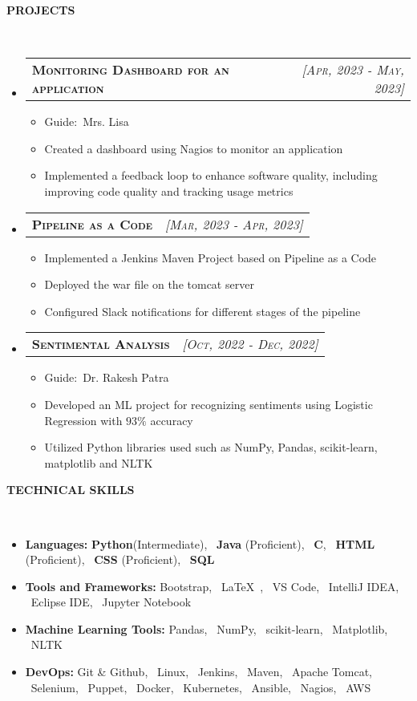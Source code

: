 \documentclass[a4paper,10pt]{article}
\makeatletter
\newcommand{\lsep}{-0.5cm}
\newcommand{\resitem}[1]{\item #1 \vspace{-2pt}}
\newcommand{\resheading}[1]{{\small \colorbox{mygrey}{\begin{minipage}{0.975\textwidth}{\textbf{#1 \vphantom{p\^{E}}}}\end{minipage}}}}
\newcommand{\ressubheading}[3]{
\begin{tabular*}{6.62in}{l @{\extracolsep{\fill}} r}
	\textsc{{\textbf{#1}}} & \textsc{\textit{[#2]}} \\
\end{tabular*}\vspace{-8pt}}
\makeatother
\begin{document}
\resheading{\textbf{PROJECTS} }\\[\lsep]
\begin{itemize}
\setlength\itemsep{0.5em}
\item \ressubheading{Monitoring Dashboard for an application} {Apr, 2023 - May, 2023}{}
\begin{itemize}
    \resitem{Guide:\ Mrs. Lisa}
    \resitem{Created a dashboard using Nagios to monitor an application}
    \resitem{Implemented a feedback loop to enhance software quality, including improving code quality and tracking usage metrics}
\end{itemize}

\item \ressubheading{Pipeline as a Code}{Mar, 2023 - Apr, 2023}{}
\begin{itemize}
    \resitem{Implemented a Jenkins Maven Project based on Pipeline as a Code}
    \resitem{Deployed the war file on the tomcat server}
    \resitem{Configured Slack notifications for different stages of the pipeline}
\end{itemize}

\item \ressubheading{Sentimental Analysis}{Oct, 2022 - Dec, 2022}{}
\begin{itemize}
    \resitem{Guide:\ Dr. Rakesh Patra}
    \resitem{Developed an ML project for recognizing sentiments using Logistic Regression with $93\%$ accuracy}
    \resitem{Utilized Python libraries used such as NumPy, Pandas, scikit-learn, matplotlib and NLTK}
\end{itemize} 
\end{itemize}

\resheading{\textbf{TECHNICAL SKILLS} }\\[\lsep]
\begin{itemize}
\setlength\itemsep{0em}
\item \noindent \textbf{Languages:} \textbf{Python}(Intermediate), \ \textbf{Java} (Proficient), \ \textbf{C}, \ \textbf{HTML} (Proficient), \ \textbf{CSS} (Proficient), \ \textbf{SQL}
 \item \noindent\textbf{Tools and Frameworks:} Bootstrap, \  \LaTeX\ , \ VS Code, \ IntelliJ IDEA, \ Eclipse IDE, \ Jupyter Notebook
\item \noindent \textbf{Machine Learning Tools:} Pandas, \ NumPy, \ scikit-learn, \ Matplotlib, \ NLTK
\item \noindent \textbf{DevOps:} Git \& Github, \ Linux, \ Jenkins, \ Maven, \ Apache Tomcat, \ Selenium, \ Puppet, \ Docker, \ Kubernetes, \ Ansible, \ Nagios, \ AWS
\end{itemize}
\end{document}
